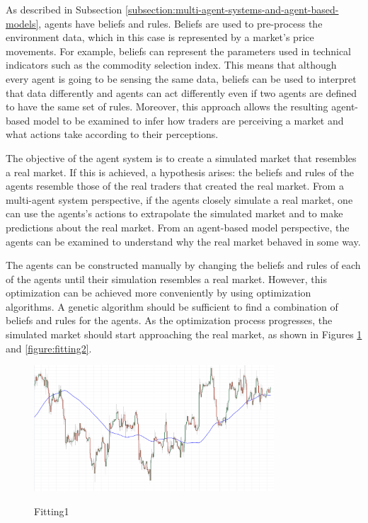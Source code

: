 \documentclass[review]{elsarticle}
\begin{document}
As described in Subsection \ref{subsection:multi-agent-systems-and-agent-based-models}, agents have beliefs and rules. Beliefs are used to pre-process the environment data, which in this case is represented by a market's price movements. For example, beliefs can represent the parameters used in technical indicators such as the commodity selection index. This means that although every agent is going to be sensing the same data, beliefs can be used to interpret that data differently and agents can act differently even if two agents are defined to have the same set of rules. Moreover, this approach allows the resulting agent-based model to be examined to infer how traders are perceiving a market and what actions take according to their perceptions.

The objective of the agent system is to create a simulated market that resembles a real market. If this is achieved, a hypothesis arises: the beliefs and rules of the agents resemble those of the real traders that created the real market. From a multi-agent system perspective, if the agents closely simulate a real market, one can use the agents's actions to extrapolate the simulated market and to make predictions about the real market. From an agent-based model perspective, the agents can be examined to understand why the real market behaved in some way.

The agents can be constructed manually by changing the beliefs and rules of each of the agents until their simulation resembles a real market. However, this optimization can be achieved more conveniently by using optimization algorithms. A genetic algorithm should be sufficient to find a combination of beliefs and rules for the agents. As the optimization process progresses, the simulated market should start approaching the real market, as shown in Figures \ref{figure:fitting1} and \ref{figure:fitting2}.

\begin{figure}
\caption{Fitting1}
\centering
\includegraphics[width=0.8\textwidth]{img/fitting1.png}
\label{figure:fitting1}
\end{figure}
\end{document}
